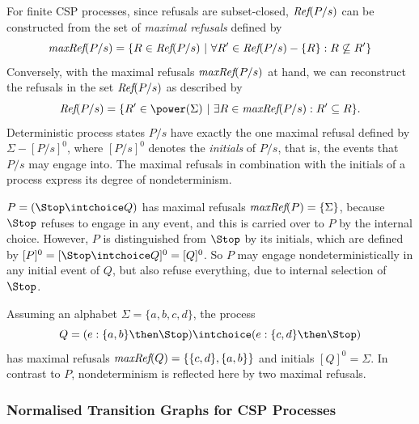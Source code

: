 For finite CSP processes, since refusals are
subset-closed, $\text{\it Ref}(P/s)$ can be constructed from the set of \emph{maximal
refusals} defined by
%
\begin{equation}
\text{\it maxRef}(P/s) = \{ R \in\text{\it Ref}(P/s)~|~\forall R'\in \text{\it Ref}(P/s) - \{ R\}: R \not\subseteq R'\}
\end{equation}
%
Conversely, with the maximal refusals $\text{\it maxRef}(P/s)$ at hand, we can
reconstruct the refusals in the set $\text{\it Ref}(P/s)$ as described by
%
\begin{equation}\label{eq:refMaxRef}
\refs(P/s) = \{ R'\in\power(\Sigma)~|~\exists R\in \maxrefs(P/s): R'\subseteq R \}.
\end{equation}
%
Deterministic process states $P/s$ have exactly the one maximal refusal
defined by $\Sigma-[P/s]^0$, where $[P/s]^0$ denotes the \emph{initials} of
$P/s$, that is, the events that $P/s$ may engage into. The maximal refusals
in combination with the initials of a process express its degree of
nondeterminism.
%
\begin{example}
\label{ex:nondetdegree} $P = (\Stop \intchoice Q)$ has maximal refusals
$\text{\it maxRef}(P) = \{ \Sigma \}$, because $\Stop$ refuses to engage in any event,
and this is carried over to $P$ by the internal choice. However, $P$ is
distinguished from $\Stop$ by its initials, which are defined by $[P]^0 = [
\Stop \intchoice Q]^0 = [Q]^0$. So $P$ may engage nondeterministically in any
initial event of $Q$, but also refuse everything, due to internal selection
of $\Stop$.

Assuming an alphabet $\Sigma = \{a,b,c,d\}$, the process
%
$$Q = (e:\{a,b\} \then \Stop) \intchoice (e:\{c,d\} \then \Stop)$$
%
has maximal refusals $\text{\it maxRef}(Q) = \{ \{c,d\}, \{a,b\} \}$ and initials
$[Q]^0=\Sigma$. In contrast to $P$, nondeterminism is reflected here by
two maximal refusals. \xbox
\end{example}



\subsubsection*{Normalised Transition Graphs for CSP Processes}
\label{sec:ntg}


